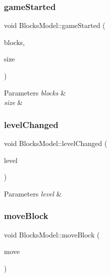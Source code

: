 \subsubsection{\texorpdfstring{gameStarted}{gameStarted}}
{\footnotesize\ttfamily void Blocks\+Model\+::game\+Started (\begin{DoxyParamCaption}\item[{const std\+::vector$<$ std\+::shared\+\_\+ptr$<$ \mbox{\hyperlink{class_block}{Block}}$<$ \mbox{\hyperlink{class_block_layout_item}{Block\+Layout\+Item}} $>$$>$$>$ \&}]{blocks,  }\item[{const size\+\_\+t \&}]{size }\end{DoxyParamCaption})\hspace{0.3cm}{\ttfamily [signal]}}


\begin{DoxyParams}{Parameters}
{\em blocks} & \\
\hline
{\em size} & \\
\hline
\end{DoxyParams}
\mbox{\label{class_blocks_model_aadc67f8541695e398bd80f66690308c4}} 
\subsubsection{\texorpdfstring{levelChanged}{levelChanged}}
{\footnotesize\ttfamily void Blocks\+Model\+::level\+Changed (\begin{DoxyParamCaption}\item[{const Game\+Level}]{level }\end{DoxyParamCaption})\hspace{0.3cm}{\ttfamily [signal]}}


\begin{DoxyParams}{Parameters}
{\em level} & \\
\hline
\end{DoxyParams}
\mbox{\label{class_blocks_model_abf01998c6ba41012b2ef6a457415b06c}} 
\subsubsection{\texorpdfstring{moveBlock}{moveBlock}}
{\footnotesize\ttfamily void Blocks\+Model\+::move\+Block (\begin{DoxyParamCaption}\item[{const \mbox{\hyperlink{struct_position}{Position}} \&}]{move }\end{DoxyParamCaption})\hspace{0.3cm}{\ttfamily [slot]}}


